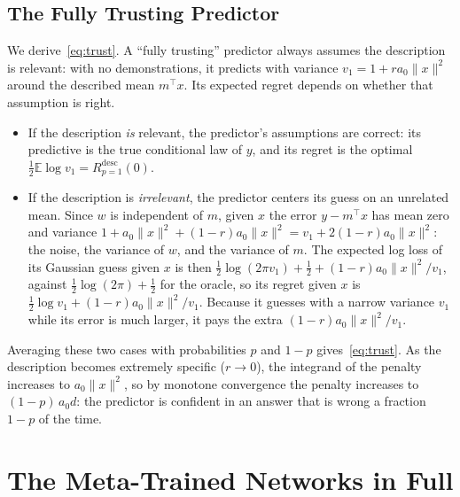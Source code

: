 \documentclass{article}
\newcommand{\E}{\mathbb{E}}
\begin{document}
\subsection{The Fully Trusting Predictor}\label{app:trust}
We derive~\eqref{eq:trust}. A ``fully trusting'' predictor always assumes the description is relevant: with no demonstrations, it predicts with variance $v_1 = 1 + r a_0 \|x\|^2$ around the described mean $m^\top x$. Its expected regret depends on whether that assumption is right.
\begin{itemize}
    \item If the description \emph{is} relevant, the predictor's assumptions are correct: its predictive is the true conditional law of $y$, and its regret is the optimal $\tfrac12 \E \log v_1 = R^{\mathrm{desc}}_{p=1}(0)$.
    \item If the description is \emph{irrelevant}, the predictor centers its guess on an unrelated mean. Since $w$ is independent of $m$, given $x$ the error $y - m^\top x$ has mean zero and variance $1 + a_0\|x\|^2 + (1-r)a_0\|x\|^2 = v_1 + 2(1-r)a_0\|x\|^2$: the noise, the variance of $w$, and the variance of $m$. The expected log loss of its Gaussian guess given $x$ is then $\tfrac12 \log(2\pi v_1) + \tfrac12 + (1-r)a_0\|x\|^2/v_1$, against $\tfrac12 \log(2\pi) + \tfrac12$ for the oracle, so its regret given $x$ is $\tfrac12 \log v_1 + (1-r)a_0\|x\|^2/v_1$. Because it guesses with a narrow variance $v_1$ while its error is much larger, it pays the extra $(1-r)a_0\|x\|^2/v_1$.
\end{itemize}
Averaging these two cases with probabilities $p$ and $1-p$ gives~\eqref{eq:trust}. As the description becomes extremely specific ($r \to 0$), the integrand of the penalty increases to $a_0\|x\|^2$, so by monotone convergence the penalty increases to $(1-p)\,a_0 d$: the predictor is confident in an answer that is wrong a fraction $1-p$ of the time.

\section{The Meta-Trained Networks in Full}\label{app:networks}
\end{document}
